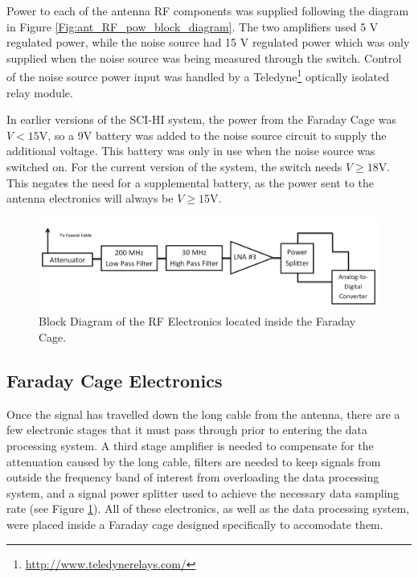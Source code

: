 Power to each of the antenna RF components was supplied following the diagram in Figure \ref{Fig:ant_RF_pow_block_diagram}. The two amplifiers used 5 V regulated power, while the noise source had 15 V regulated power which was only supplied when the noise source was being measured through the switch. Control of the noise source power input was handled by a Teledyne\footnote{\url{http://www.teledynerelays.com/}} optically isolated relay module. 

In earlier versions of the SCI-HI system, the power from the Faraday Cage was $V< 15$V, so a 9V battery was added to the noise source circuit to supply the additional voltage. This battery was only in use when the noise source was switched on. For the current version of the system, the switch needs $V \geq 18$V. This negates the need for a supplemental battery, as the power sent to the antenna electronics will always be $V \geq 15$V.  

\begin{figure}[htb]
\begin{center}
\includegraphics[width=0.9\linewidth]{SCIHI_system/figures/faraday_cage_rf_block_diagram.png}
\caption{Block Diagram of the RF Electronics located inside the Faraday Cage.}
\label{Fig:fcage_RF_block_diagram}
\end{center}
\end{figure}

\subsection{Faraday Cage Electronics}
Once the signal has travelled down the long cable from the antenna, there are a few electronic stages that it must pass through prior to entering the data processing system. A third stage amplifier is needed to compensate for the attenuation caused by the long cable, filters are needed to keep signals from outside the frequency band of interest from overloading the data processing system, and a signal power splitter used to achieve the necessary data sampling rate (see Figure \ref{Fig:fcage_RF_block_diagram}). All of these electronics, as well as the data processing system, were placed inside a Faraday cage designed specifically to accomodate them. 

